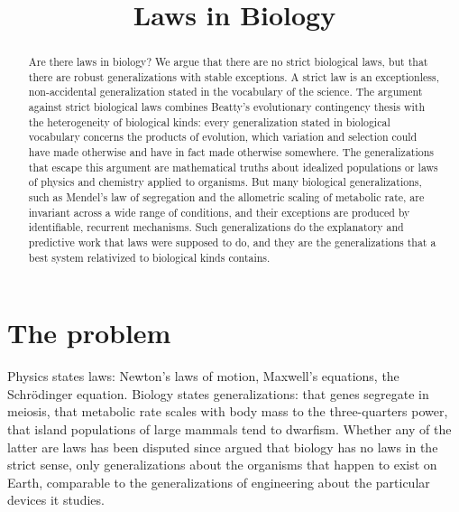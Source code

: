 \documentclass{situationist-preprint}
\title{Laws in Biology}
\begin{document}
\maketitle

\begin{abstract}
Are there laws in biology? We argue that there are no strict biological laws, but that there are robust generalizations with stable exceptions. A strict law is an exceptionless, non-accidental generalization stated in the vocabulary of the science. The argument against strict biological laws combines Beatty's evolutionary contingency thesis with the heterogeneity of biological kinds: every generalization stated in biological vocabulary concerns the products of evolution, which variation and selection could have made otherwise and have in fact made otherwise somewhere. The generalizations that escape this argument are mathematical truths about idealized populations or laws of physics and chemistry applied to organisms. But many biological generalizations, such as Mendel's law of segregation and the allometric scaling of metabolic rate, are invariant across a wide range of conditions, and their exceptions are produced by identifiable, recurrent mechanisms. Such generalizations do the explanatory and predictive work that laws were supposed to do, and they are the generalizations that a best system relativized to biological kinds contains.
\end{abstract}

\section{The problem}\label{s:problem}

Physics states laws: Newton's laws of motion, Maxwell's equations, the Schr\"odinger equation. Biology states generalizations: that genes segregate in meiosis, that metabolic rate scales with body mass to the three-quarters power, that island populations of large mammals tend to dwarfism. Whether any of the latter are laws has been disputed since \citet{Smart1963} argued that biology has no laws in the strict sense, only generalizations about the organisms that happen to exist on Earth, comparable to the generalizations of engineering about the particular devices it studies.
\end{document}
